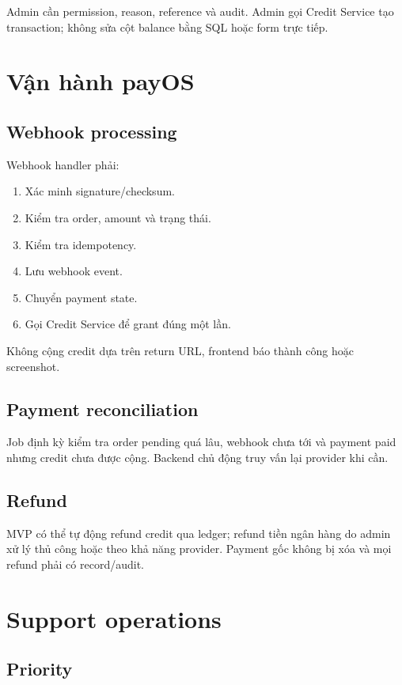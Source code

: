 \documentclass[11pt,a4paper]{article}
\begin{document}
Admin cần permission, reason, reference và audit. Admin gọi Credit Service tạo transaction; không sửa cột balance bằng SQL hoặc form trực tiếp.

\section{Vận hành payOS}

\subsection{Webhook processing}

Webhook handler phải:

\begin{enumerate}
  \item Xác minh signature/checksum.
  \item Kiểm tra order, amount và trạng thái.
  \item Kiểm tra idempotency.
  \item Lưu webhook event.
  \item Chuyển payment state.
  \item Gọi Credit Service để grant đúng một lần.
\end{enumerate}

Không cộng credit dựa trên return URL, frontend báo thành công hoặc screenshot.

\subsection{Payment reconciliation}

Job định kỳ kiểm tra order pending quá lâu, webhook chưa tới và payment paid nhưng credit chưa được cộng. Backend chủ động truy vấn lại provider khi cần.

\subsection{Refund}

MVP có thể tự động refund credit qua ledger; refund tiền ngân hàng do admin xử lý thủ công hoặc theo khả năng provider. Payment gốc không bị xóa và mọi refund phải có record/audit.

\section{Support operations}

\subsection{Priority}
\end{document}

